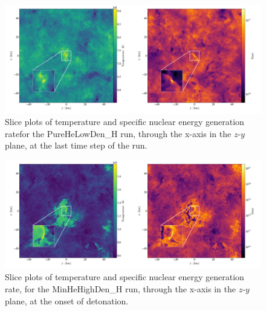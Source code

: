 \begin{center}
\begin{figure}[!htb]

\includegraphics[width=1.0\textwidth]{combined_512_10e5_1.0_new.png}
\centering
\caption[Slice plots of temperature and specific nuclear energy generation rate, for the PureHeLowDen\_H run]{Slice plots of temperature and specific nuclear energy generation ratefor the PureHeLowDen\_H run, through the x-axis in the $z$-$y$ plane, at the last time step of the run.}
\label {fig:temp_enuc}

\end{figure}
\end{center}
\begin{center}
\begin{figure}[!htb]

\includegraphics[width=1.0\textwidth]{combined_512_10e6_0.1_new.png}
\centering
\caption[Slice plots of temperature and specific nuclear energy generation rate, for the MinHeHighDen\_H run]{Slice plots of temperature and specific nuclear energy generation rate, for the MinHeHighDen\_H run, through the x-axis in the $z$-$y$ plane, at the onset of detonation.}
\label {fig:temp_enuc}

\end{figure}
\end{center}
